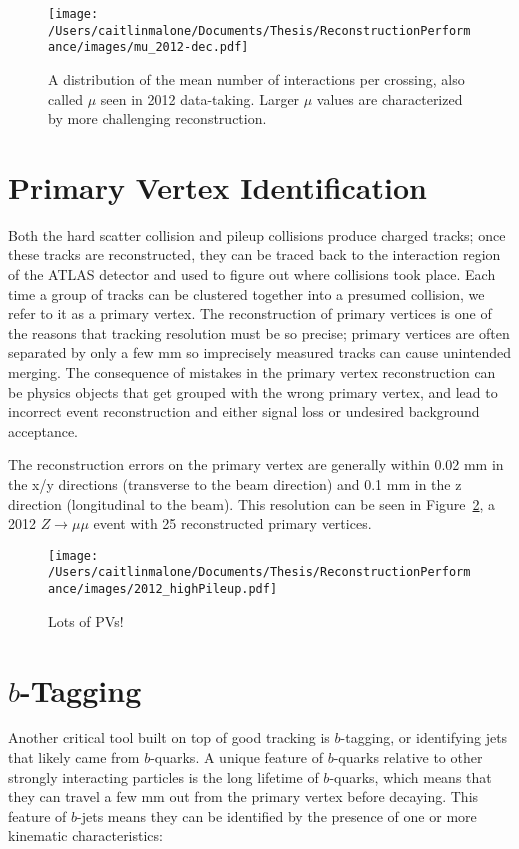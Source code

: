 \begin{figure}
	\texttt{[image: /Users/caitlinmalone/Documents/Thesis/ReconstructionPerformance/images/mu\_2012-dec.pdf]}
	\caption{A distribution of the mean number of interactions per crossing, also called $\mu$ seen in 2012 data-taking.  Larger $\mu$ values are characterized by more challenging reconstruction. 	\label{fig:mu_2012}  }
\end{figure}

\section{Primary Vertex Identification}
\label{sec:pv}
Both the hard scatter collision and pileup collisions produce charged tracks; once these tracks are reconstructed, they can be traced back to the interaction region of the ATLAS detector and used to figure out where collisions took place.  Each time a group of tracks can be clustered together into a presumed collision, we refer to it as a primary vertex.  The reconstruction of primary vertices is one of the reasons that tracking resolution must be so precise; primary vertices are often separated by only a few mm so imprecisely measured tracks can cause unintended merging.  The consequence of mistakes in the primary vertex reconstruction can be physics objects that get grouped with the wrong primary vertex, and lead to incorrect event reconstruction and either signal loss or undesired background acceptance.

The reconstruction errors on the primary vertex are generally within 0.02 mm in the x/y directions (transverse to the beam direction) and 0.1 mm in the z direction (longitudinal to the beam).   This resolution can be seen in Figure~\ref{fig:pileup_pv}, a 2012 $Z\rightarrow\mu\mu$ event with 25 reconstructed primary vertices.


\begin{figure}
	\texttt{[image: /Users/caitlinmalone/Documents/Thesis/ReconstructionPerformance/images/2012\_highPileup.pdf]}
	\caption{Lots of PVs! 	\label{fig:pileup_pv}  }
\end{figure}


\section{$b$-Tagging}
\label{sec:b-tag}
Another critical tool built on top of good tracking is $b$-tagging, or identifying jets that likely came from $b$-quarks.  A unique feature of $b$-quarks relative to other strongly interacting particles is the long lifetime of $b$-quarks, which means that they can travel a few mm out from the primary vertex before decaying.  This feature of $b$-jets means they can be identified by the presence of one or more kinematic characteristics:

